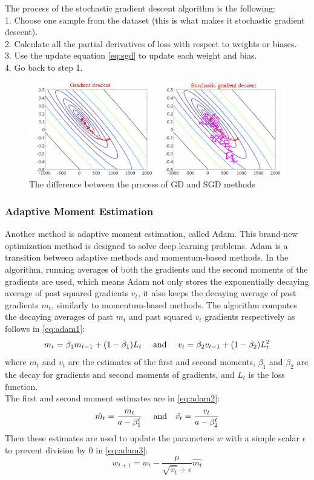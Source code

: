 \noindent The process of the stochastic gradient descent algorithm is the following:\\
1. Choose one sample from the dataset (this is what makes it stochastic gradient descent).\\
2. Calculate all the partial derivatives of loss with respect to weights or biases. \\
3. Use the update equation \eqref{eq:sgd} to update each weight and bias.\\
4. Go back to step 1.

\begin{figure}[h]
	\centering
	\includegraphics[height=0.28\linewidth]{./figures/stochastic}
	\caption{The difference between the process of GD and SGD methods}
	\label{fig:stochastic}
\end{figure}


\subsubsection{Adaptive Moment Estimation}

Another method is adaptive moment estimation, called Adam. This brand-new optimization method is designed to solve deep learning problems. Adam is a transition between adaptive methods and momentum-based methods. In the algorithm, running averages of both the gradients and the second moments of the gradients are used, which means Adam not only stores the exponentially decaying average of past squared gradients $v_t$, it also keeps the decaying average of past gradients $m_t$, similarly to momentum-based methods. The algorithm computes the decaying averages of past $m_t$ and past squared $v_t$ gradients respectively as follows in \eqref{eq:adam1}:
\begin{equation} m_t = \beta_1 m_{t-1} + (1-\beta_1)L_t ~~~~\hbox{and}~~~\ v_t = \beta_2 v_{t-1} + (1-\beta_2)L^2_t \label{eq:adam1} \end{equation}
where $m_t$ and $v_t$ are the estimates of the first and second moments, $\beta_1$ and $\beta_2$ are the decay for gradients and second moments of gradients, and $L_t$ is the loss function.\\
The first and second moment estimates are in \eqref{eq:adam2}:
\begin{equation} \hat{m_t} = \frac{m_t}{a-\beta^t_1} ~~~~\hbox{and}~~~ \hat{v_t} = \frac{v_t}{a-\beta^t_2} \label{eq:adam2} \end{equation}
Then these estimates are used to update the parameters $w$ with a simple scalar $\epsilon$ to prevent division by 0 in \eqref{eq:adam3}:
\begin{equation} w_{t+1} = w_t - \frac{\mu}{\sqrt{\hat{v_t}}+\epsilon}\hat{m_t} \label{eq:adam3} \end{equation}


